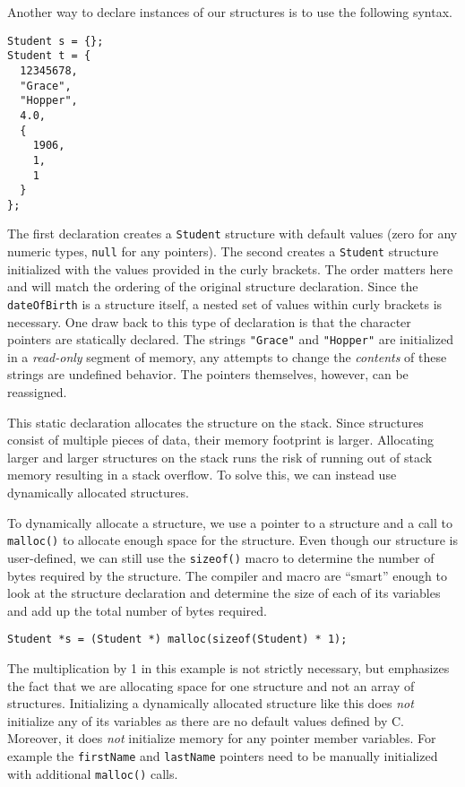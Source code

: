 Another way to declare instances of our structures
is to use the following syntax.

\begin{verbatim}
Student s = {};
Student t = {
  12345678,
  "Grace",
  "Hopper",
  4.0,
  {
    1906,
    1,
    1
  }
};
\end{verbatim}

The first declaration creates a \texttt{Student} structure
with default values (zero for any numeric types, \texttt{null}
for any pointers).  The second creates a \texttt{Student}
structure initialized with the values provided in the curly brackets.
The order matters here and will match the ordering of the original
structure declaration.  Since the \texttt{dateOfBirth} is a
structure itself, a nested set of values within curly brackets is 
necessary.  One draw back to this type of declaration is that the
character pointers are statically declared.  The strings \texttt{"Grace"} and \texttt{"Hopper"} are initialized in a 
\emph{read-only} segment of memory, any attempts to change
the \emph{contents} of these strings are undefined behavior.  
The pointers themselves, however, can be reassigned.

This static declaration allocates the structure on the stack.
Since structures consist of multiple pieces of data, their memory 
footprint is larger.  
Allocating larger and larger structures on the stack runs the
risk of running out of stack memory resulting in a 
 stack overflow.
To solve this, we can instead use dynamically allocated structures.

To dynamically allocate a structure, we use a pointer to a structure
and a call to \texttt{malloc()} to allocate enough space
for the structure.  Even though our structure is user-defined, we
can still use the \texttt{sizeof()} macro to determine
the number of bytes required by the structure.  The compiler and
macro are ``smart'' enough to look at the structure declaration and
determine the size of each of its variables and add up the total
number of bytes required.

\texttt{Student *s = (Student *) malloc(sizeof(Student) * 1);}

The multiplication by 1 in this example is not strictly necessary, but
emphasizes the fact that we are allocating space for one structure
and not an array of structures.  Initializing a dynamically allocated
structure like this does \emph{not} initialize any of its variables
as there are no default values defined by C.  Moreover, it does 
\emph{not} initialize memory for any pointer member variables.  For
example the \texttt{firstName} and \texttt{lastName}
pointers need to be manually initialized with additional 
\texttt{malloc()} calls.

